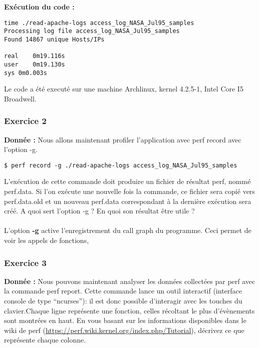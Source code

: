 \textbf{Exécution du code : } \\
\begin{lstlisting}
time ./read-apache-logs access_log_NASA_Jul95_samples 
Processing log file access_log_NASA_Jul95_samples
Found 14867 unique Hosts/IPs

real	0m19.116s
user	0m19.130s
sys	0m0.003s
\end{lstlisting}
Le code a été executé sur une machine Archlinux, kernel 4.2.5-1, Intel Core I5 Broadwell.

\subsubsection{Exercice 2}
\textbf{Donnée : } Nous	allons	maintenant	profiler	l'application	avec	perf	record	avec	l'option	-g.
\begin{lstlisting}
$ perf record -g ./read-apache-logs access_log_NASA_Jul95_samples
\end{lstlisting}
L'exécution	de	cette	commande	doit	produire	un	fichier	de	résultat	perf,	nommé	perf.data.	Si	l'on	
exécute	une	nouvelle	fois	la	commande,	ce	fichier	sera	copié	vers	perf.data.old et	un	nouveau	
perf.data	correspondant	à	la	dernière	exécution	sera	créé.
A	quoi	sert	l'option	-g	?	En	quoi	son	résultat	être	utile	?\\\\

L'option \textbf{-g} active l'enregistrement du call graph du programme. Ceci permet de voir les appels de fonctions, 

\subsubsection{Exercice 3}
\textbf{Donnée : } Nous	pouvons	maintenant	analyser	les	données	collectées	par	perf	avec	la	commande	perf	report.	
Cette	commande	lance	un	outil	interactif	(interface	console de	type	“ncurses”):	il	est	donc	possible	
d'interagir avec	les	touches	du	clavier.Chaque	ligne	représente	une	fonction,	celles	récoltant	le	plus	d'évènements	sont	montrées	en	haut.	
En	vous	basant sur	les	informations	disponibles	dans	le	wiki	de	perf	
(\url{https://perf.wiki.kernel.org/index.php/Tutorial}),	décrivez	ce	que	représente	chaque	colonne.\\\\

